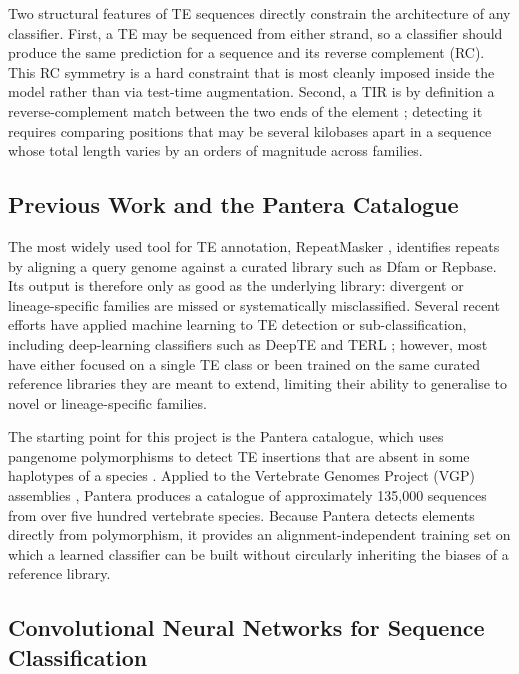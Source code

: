 \documentclass[12pt]{article}
\begin{document}
Two structural features of TE sequences directly constrain the architecture of any classifier. First, a TE may be sequenced from either strand, so a classifier should produce the same prediction for a sequence and its reverse complement (RC). This RC symmetry is a hard constraint that is most cleanly imposed inside the model rather than via test-time augmentation. Second, a TIR is by definition a reverse-complement match between the two ends of the element \cite{wicker2007unified}; detecting it requires comparing positions that may be several kilobases apart in a sequence whose total length varies by an orders of magnitude across families.

\subsection{Previous Work and the Pantera Catalogue}

The most widely used tool for TE annotation, RepeatMasker \cite{smit2015repeatmasker}, identifies repeats by aligning a query genome against a curated library such as Dfam \cite{storer2021dfam} or Repbase. Its output is therefore only as good as the underlying library: divergent or lineage-specific families are missed or systematically misclassified. Several recent efforts have applied machine learning to TE detection or sub-classification, including deep-learning classifiers such as DeepTE \cite{yan2020deepte} and TERL \cite{dacruz2021terl}; however, most have either focused on a single TE class or been trained on the same curated reference libraries they are meant to extend, limiting their ability to generalise to novel or lineage-specific families.

The starting point for this project is the Pantera catalogue, which uses pangenome polymorphisms to detect TE insertions that are absent in some haplotypes of a species \cite{sierra2024pantera}. Applied to the Vertebrate Genomes Project (VGP) assemblies \cite{rhie2021vgp}, Pantera produces a catalogue of approximately 135{,}000 sequences from over five hundred vertebrate species. Because Pantera detects elements directly from polymorphism, it provides an alignment-independent training set on which a learned classifier can be built without circularly inheriting the biases of a reference library. 

\subsection{Convolutional Neural Networks for Sequence Classification}
\end{document}
